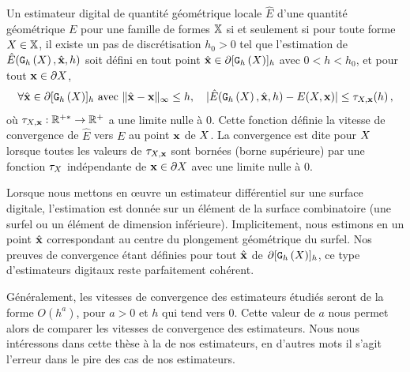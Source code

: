\begin{definition}{}
  \label{def:multigrid-convergence-local}
  Un estimateur digital de quantité géométrique locale $\hat{E}$ d'une quantité géométrique
  $E$  pour une famille de formes $\mathbb{X}$ si
  et seulement si pour toute forme $X \in \mathbb{X}$, il existe un pas de
  discrétisation $h_0 > 0$ tel que l'estimation de $\hat{E}(\mathtt{G}_{h}\left(X\right),\hat{\mathbf{x}},h)$
  soit défini en tout point $\hat{\mathbf{x}} \in \partial \lbrack \mathtt{G}_{h}\left(X\right) \rbrack_{h}$ avec $0 < h < h_0$,
  et pour tout $\mathbf{x} \in \partial X$,
  \begin{equation}
    \forall \hat{\mathbf{x}} \in \partial\lbrack \mathtt{G}_{h}\left(X\right) \rbrack_{h} \text{~avec~} \| \hat{\mathbf{x}} -\mathbf{x}\|_\infty
    \le h, \quad | \hat{E}(\mathtt{G}_{h}\left(X\right),\hat{\mathbf{x}},h) - E(X,\mathbf{x}) | \le \tau_{X,\mathbf{x}}(h) \,,
  \end{equation}
  où $\tau_{X,\mathbf{x}}: \mathbb{R}^{+*} \rightarrow \mathbb{R}^+$ a une limite
  nulle à $0$. Cette fonction définie la vitesse de convergence de $\hat{E}$
  vers $E$ au point $\mathbf{x}$ de $X$. La convergence est dite
   pour $X$ lorsque toutes les valeurs de
  $\tau_{X,\mathbf{x}}$ sont bornées (borne supérieure) par une fonction
  $\tau_{X}$ indépendante de $\mathbf{x} \in \partial X$ avec une limite nulle à $0$.
\end{definition}

Lorsque nous mettons en œuvre un estimateur différentiel sur une surface digitale,
l'estimation est donnée sur un élément de la surface combinatoire (une surfel ou
un élément de dimension inférieure). Implicitement, nous estimons en un point
$\hat{\mathbf{x}}$ correspondant au centre du plongement géométrique du surfel. Nos
preuves de convergence étant définies pour tout $\hat{\mathbf{x}}$ de $\partial
\lbrack \mathtt{G}_{h}\left(X\right) \rbrack_{h}$, ce type d'estimateurs digitaux reste
parfaitement cohérent.

Généralement, les vitesses de convergence des estimateurs étudiés seront de la
forme $O(h^a)$, pour $a > 0$ et $h$ qui tend vers $0$. Cette valeur de $a$ nous
permet alors de comparer les vitesses de convergence des estimateurs. Nous nous
intéressons dans cette thèse à la 
de nos estimateurs, en d'autres mots il s'agit l'erreur dans le pire des cas de
nos estimateurs.

